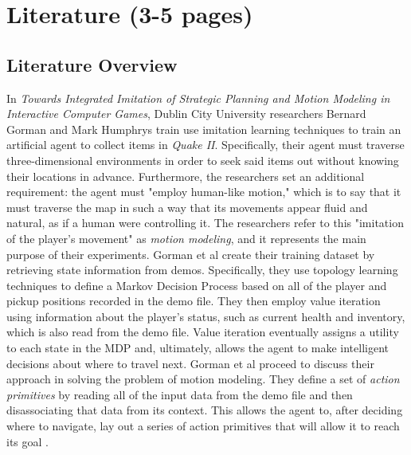 \chapter{Literature (3-5 pages)}
\label{ch:Literature}



\section{Literature Overview}

In {\it Towards Integrated Imitation of Strategic Planning and Motion Modeling in Interactive Computer Games}, Dublin City University researchers Bernard Gorman and Mark Humphrys train use imitation learning techniques to train an artificial agent to collect items in {\it Quake II}. Specifically, their agent must traverse three-dimensional environments in order to seek said items out without knowing their locations in advance. Furthermore, the researchers set an additional requirement: the agent must "employ human-like motion," which is to say that it must traverse the map in such a way that its movements appear fluid and natural, as if a human were controlling it. The researchers refer to this "imitation of the player's movement" as {\it motion modeling}, and it represents the main purpose of their experiments. Gorman et al create their training dataset by retrieving state information from demos. Specifically, they use topology learning techniques to define a Markov Decision Process based on all of the player and pickup positions recorded in the demo file. They then employ value iteration using information about the player's status, such as current health and inventory, which is also read from the demo file. Value iteration eventually assigns a utility to each state in the MDP and, ultimately, allows the agent to make intelligent decisions about where to travel next. Gorman et al proceed to discuss their approach in solving the problem of motion modeling. They define a set of {\it action primitives} by reading all of the input data from the demo file and then disassociating that data from its context. This allows the agent to, after deciding where to navigate, lay out a series of action primitives that will allow it to reach its goal \cite{Gorman:2006}.

